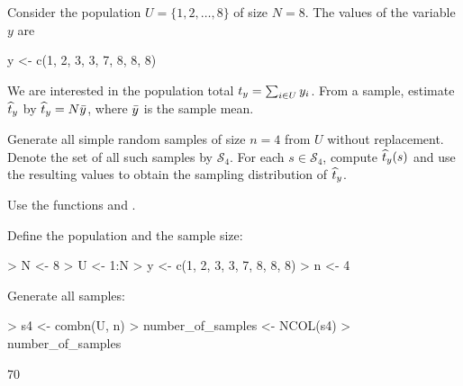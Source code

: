 




\begin{Problem}\label{problem:sampling}
    Consider the population $U = \{1, 2, \ldots, 8\}$ of size $N = 8$.
    The values of the variable $y$ are

\begin{Scode}
y <- c(1, 2, 3, 3, 7, 8, 8, 8)
\end{Scode}

    We are interested in the population total
    $t_y = \sum_{i \in U} y_i$. From a sample, estimate $\widehat{t}_y$ by
    $\widehat{t}_y = N \bar{y}$, where $\bar{y}$ is the sample mean.

    \vspace{0.25em}

\begin{Subtask}
    \item Generate all simple random samples of size $n = 4$ from $U$ without
        replacement. Denote the set of all such samples by $\mathscr{S}_4$. For
        each $s \in \mathscr{S}_4$, compute $\widehat{t}_y(s)$ and use the resulting
        values to obtain the sampling distribution of $\widehat{t}_y$.

        \begin{Rhint}
            Use the functions  and .
        \end{Rhint}

    \begin{Solution}
        Define the population and the sample size:

\begin{Schunk}
\begin{Sinput}
> N <- 8
> U <- 1:N
> y <- c(1, 2, 3, 3, 7, 8, 8, 8)
> n <- 4
\end{Sinput}
\end{Schunk}

        Generate all samples:

\begin{Schunk}
\begin{Sinput}
> s4 <- combn(U, n)
> number_of_samples <- NCOL(s4)
> number_of_samples
\end{Sinput}
\begin{Soutput}
[1] 70
\end{Soutput}
\end{Schunk}


\end{Solution}
\end{Subtask}
\end{Problem}
